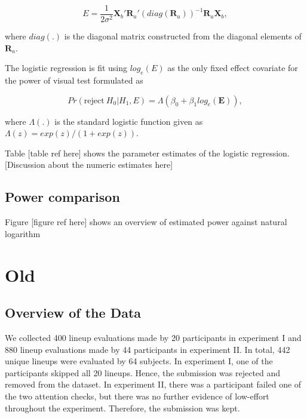 \documentclass[]{interact}
\theoremstyle{plain}%
\theoremstyle{definition}
\theoremstyle{remark}
\begin{document}
\begin{equation} \label{eq:effect-size-ex1}
E = \frac{1}{2\sigma^2}\boldsymbol{X}_b'\boldsymbol{R}_a'(diag(\boldsymbol{R}_a))^{-1}\boldsymbol{R}_a\boldsymbol{X}_b,
\end{equation}

where \(diag(.)\) is the diagonal matrix constructed from the diagonal
elements of \(\boldsymbol{R}_a\).

The logistic regression is fit using \(log_e(E)\) as the only fixed
effect covariate for the power of visual test formulated as

\begin{equation} \label{eq:logistic-regression-1-1}
Pr(\text{reject}~H_0|H_1,E) = \Lambda(\beta_0 + \beta_1 log_e(\boldsymbol{E})),
\end{equation}

where \(\Lambda(.)\) is the standard logistic function given as
\(\Lambda(z) = exp(z)/(1+exp(z))\).

Table {[}table ref here{]} shows the parameter estimates of the logistic
regression. {[}Discussion about the numeric estimates here{]}

\hypertarget{power-comparison}{%
\subsection{Power comparison}\label{power-comparison}}

Figure {[}figure ref here{]} shows an overview of estimated power
against natural logarithm

\hypertarget{old}{%
\section{Old}\label{old}}

\hypertarget{overview-of-the-data}{%
\subsection{Overview of the Data}\label{overview-of-the-data}}

We collected 400 lineup evaluations made by 20 participants in
experiment I and 880 lineup evaluations made by 44 participants in
experiment II. In total, 442 unique lineups were evaluated by 64
subjects. In experiment I, one of the participants skipped all 20
lineups. Hence, the submission was rejected and removed from the
dataset. In experiment II, there was a participant failed one of the two
attention checks, but there was no further evidence of low-effort
throughout the experiment. Therefore, the submission was kept.
\end{document}
